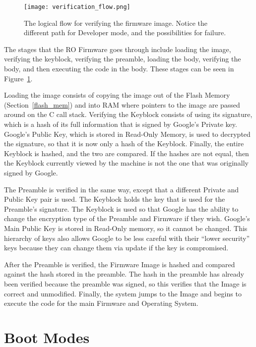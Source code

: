 \begin{figure}
  \centering
  \texttt{[image: verification\_flow.png]}
  \caption{The logical flow for verifying the firmware image. Notice
  the different path for Developer mode, and the possibilities for
  failure.}\label{fig:verif_flow}
\end{figure}

The stages that the RO Firmware goes through include loading the image, verifying the keyblock, verifying the preamble, loading the body, verifying the body, and then executing the code in the body. 
These stages can be seen in Figure~\ref{fig:verif_flow}.

Loading the image consists of copying the image out of the Flash Memory (Section~\ref{flash_mem}) and into RAM where pointers to the image are passed around on the C call stack.
Verifying the Keyblock consists of using its signature, which is a hash of its full information that is signed by Google's Private key.
Google's Public Key, which is stored in Read-Only Memory, is used to decrypted the signature, so that it is now only a hash of the Keyblock.
Finally, the entire Keyblock is hashed, and the two are compared.
If the hashes are not equal, then the Keyblock currently viewed by the machine is not the one that was originally signed by Google.

The Preamble is verified in the same way, except that a different Private and Public Key pair is used.
The Keyblock holds the key that is used for the Preamble's signature.
The Keyblock is used so that Google has the ability to change the encryption
type of the Preamble and Firmware if they wish.
Google's Main Public Key is stored in Read-Only memory, so it cannot be changed.
This hierarchy of keys also allows Google to be less careful with their ``lower
security'' keys because they can change them via update if the key is
compromised.

After the Preamble is verified, the Firmware Image is hashed and compared
against the hash stored in the preamble. 
The hash in the preamble has already been verified because the preamble was
signed, so this verifies that the Image is correct and unmodified. Finally, the
system jumps to the Image and begins to execute the code for the main Firmware
and Operating System.


\section{Boot Modes}\label{sec:boot-modes}

